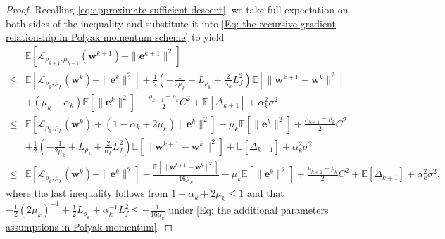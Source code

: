 \documentclass{article}
\theoremstyle{plain}
\theoremstyle{definition}
\theoremstyle{remark}
\newcommand{\EE}{\mathbb{E}}
\newcommand{\be}{\bm{e}}
\newcommand{\calL}{\mathcal{L}}
\newcommand{\bw}{\bm{w}}
\numberwithin{equation}{section}
\begin{document}
\begin{proof}
Recalling \eqref{eq:approximate-sufficient-descent}, we take full expectation on both
    sides of the inequality and substitute it into \eqref{Eq: the recursive gradient relationship in Polyak momentum scheme}
    to yield
    \begin{equation}
        \label{Eq: the descent property of potential function with recursive gradient}
\begin{aligned}
&\EE [ \calL_{\rho_{k+1}, \mu_{k+1}}(\bw^{k+1}) + \| \be^{k+1}\|^{2}] \\
\leq{}&
\EE [ \calL_{\rho_k, \mu_k}(\bw^{k}) + \| \be^{k}\|^{2}] + \frac{1}{2}(- \frac{1}{2\mu_{k}}+ L_{\rho_k}+ \frac{2}{\alpha_{k}}L_f^{2})
\EE [ \| \bw^{k+1}- \bw^{k}\|^{2}] \\
&+ (\mu_{k} - \alpha_k)\EE [\| \be^{k}\|^{2}]
+ \frac{\rho_{k+1}- \rho_{k}}{2}C^{2}
+ \EE[\Delta_{k+1}] + \alpha_{k}^{2}\sigma^{2} \\
\leq{}&
\EE [ \calL_{\rho_k, \mu_k}(\bw^{k})
+ (1 - \alpha_{k}+ 2 \mu_{k}) \| \be^{k}\|^{2}] - \mu_{k}\EE [\| \be^{k}\|^{2}]
+ \frac{\rho_{k+1}- \rho_{k}}{2}C^{2} \\
&+ \frac{1}{2}(- \frac{1}{2\mu_{k}}+ L_{\rho_k}+ \frac{2}{\alpha_{k}}L_f^{2})
\EE [ \| \bw^{k+1}- \bw^{k}\|^{2}] + \EE[\Delta_{k+1}] + \alpha_{k}^{2}\sigma^{2} \\
\leq{}&
\EE [ \calL_{\rho_k, \mu_k}(\bw^{k}) + \| \be^{k}\|^{2}]
- \frac{\EE [ \| \bw^{k+1}- \bw^{k}\|^{2}]}{16\mu_k}- \mu_{k}\EE [\| \be^{k}\|^{2}]
+\frac{\rho_{k+1}- \rho_{k}}{2}C^{2}
+ \EE[\Delta_{k+1}]
+ \alpha_{k}^{2}\sigma^{2},
\end{aligned}
    \end{equation}
where the last inequality follows from $1 - \alpha_{k}+ 2\mu_{k}\leq 1$ and
    that $-\tfrac{1}{2}(2\mu_k)^{-1}+ \tfrac{1}{2}L_{\rho_k}+ \alpha_k^{-1}L_f^2\leq -\tfrac{1}{16\mu_k}$ under \eqref{Eq: the additional parameters assumptions in Polyak momentum}.


\end{proof}
\end{document}
